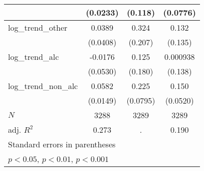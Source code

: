 {\begin{tabular}{l*{3}{c}}
            &    (0.0233)         &     (0.118)         &    (0.0776)         \\
\hline
log\_trend\_other&      0.0389         &       0.324         &       0.132         \\
            &    (0.0408)         &     (0.207)         &     (0.135)         \\
\hline
log\_trend\_alc&     -0.0176         &       0.125         &    0.000938         \\
            &    (0.0530)         &     (0.180)         &     (0.138)         \\
\hline
log\_trend\_non\_alc&      0.0582\sym{***}&       0.225\sym{**} &       0.150\sym{**} \\
            &    (0.0149)         &    (0.0795)         &    (0.0520)         \\
\hline
\(N\)       &        3288         &        3289         &        3289         \\
adj. \(R^{2}\)&       0.273         &           .         &       0.190         \\
\hline\hline
\multicolumn{4}{l}{\footnotesize Standard errors in parentheses}\\
\multicolumn{4}{l}{\footnotesize \sym{*} \(p<0.05\), \sym{**} \(p<0.01\), \sym{***} \(p<0.001\)}\\
\end{tabular}
}
